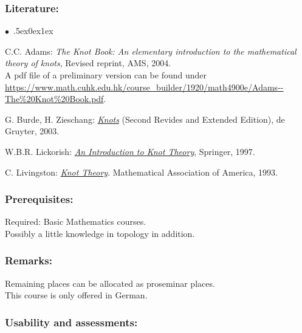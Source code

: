\documentclass[a4paper,10pt]{article}
\renewenvironment{itemize}{\begin{list}{$\bullet$\ }{\itemsep.5ex\setlength{\topsep}{0.5\itemsep}\parsep0ex\labelsep1ex\settowidth{\labelwidth}{$\bullet$\ }\setlength{\leftmargin}{\labelwidth}\addtolength{\leftmargin}{3ex}\addtolength{\leftmargin}{\labelsep}}}{\end{list}}
\begin{document}
\subsubsection*{\large
    Literature:
}
\begin{itemize} 
\item C.C. Adams: \textit{The Knot Book: An elementary introduction to the mathematical theory of knots}, Revised reprint, AMS, 2004.\\
A pdf file of a preliminary version can be found under \url{https://www.math.cuhk.edu.hk/course\_builder/1920/math4900e/Adams--The\%20Knot\%20Book.pdf}.            
\item G. Burde, H. Zieschang: \href{https://www.maths.ed.ac.uk/~v1ranick/papers/burdzies.pdf}{\textit{Knots}} (Second Revides and Extended Edition), de Gruyter, 2003.
\item W.B.R. Lickorish: \href{http://www.redi-bw.de/start/unifr/EBooks-springer/10.1007/978-1-4612-0691-0}{\textit{An Introduction to Knot Theory}}, Springer, 1997.
\item C. Livingston: \href{https://www.math.cuhk.edu.hk/course\_builder/1920/math4900e/Livingston\%20C.---Knot\%20theory\%20(MAA,\%201996).pdf}{\textit{Knot Theory}}. Mathematical Association of America, 1993.
\end{itemize}
\subsubsection*{\large
    Prerequisites:
}
Required: Basic Mathematics courses. \\ Possibly a little  knowledge in topology in addition.
\subsubsection*{\large
    Remarks:
}
Remaining places can be allocated as proseminar places. \\ This course is only offered in German.
\cleardoublepage
\subsubsection*{\large
    Usability and assessments:
}
\end{document}
